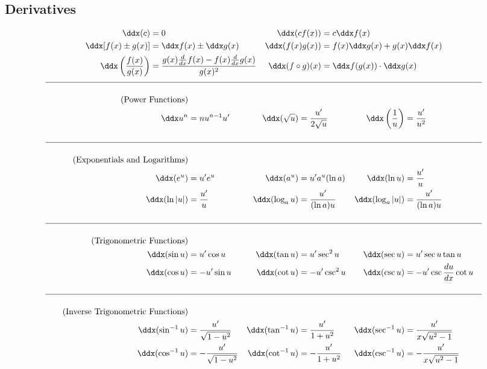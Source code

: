 \documentclass{book}
\newcommand{\dudx}{\dfrac{du}{dx}}
\begin{document}
\begin{appendices}
\section*{Derivatives}
\begin{align*}
\ddx(c) &= 0 & \ddx(cf(x))  &= c\ddx f(x) \\%
\ddx[f(x)\pm g(x)]  &= \ddx f(x) \pm \ddx g(x) &\ddx(f(x)g(x)) &= f(x)\ddx g(x) + g(x)\ddx f(x)\\
\ddx\left(\dfrac{f(x)}{g(x)}\right) &= \dfrac{g(x)\frac{d}{dx}f(x) - f(x)\frac{d}{dx} g(x)}{g(x)^2} & \ddx(f\circ g)(x) &=\ddx f(g(x))\cdot \ddx g(x)
\end{align*}
\begin{align}
\hline\nonumber\\\tag{Power Functions}\\
\nonumber \ddx u^n &= nu^{n-1}u' & \ddx(\sqrt{u}) &= \dfrac{u'}{2\sqrt{u}} & \ddx\left(\dfrac{1}{u}\right) &= \dfrac{u'}{u^2}\\\nonumber\\
\hline\nonumber\\\tag{Exponentials and Logarithms}\\
\nonumber \ddx(e^u) &= u'e^u & \ddx(a^u) &= u'a^u(\ln a) &\ddx(\ln u) &= \dfrac{u'}{u} \\
\nonumber \ddx(\ln |u|) &= \dfrac{u'}{u} & \ddx(\log_a u) &= \dfrac{u'}{(\ln a)u} & \ddx(\log_a |u|) &= \dfrac{u'}{(\ln a)u}\\\nonumber\\
\hline\nonumber\\\tag{Trigonometric Functions}\\
\nonumber \ddx(\sin u) &= u'\cos u & \ddx(\tan u) &= u'\sec^2 u& \ddx(\sec u) &= u'\sec u\tan u\\
\nonumber \ddx(\cos u) &= -u'\sin u & \ddx(\cot u) &= -u'\csc^2 u& \ddx(\csc u) &= -u'\csc \dudx\cot u\\\nonumber\\
\hline\nonumber\\\tag{Inverse Trigonometric Functions}\\
\nonumber \ddx(\sin^{-1} u) &= \dfrac{u'}{\sqrt{1-u^2}} & \ddx(\tan^{-1} u) &= \dfrac{u'}{1+u^2} &\ddx(\sec^{-1}u) &= \dfrac{u'}{x\sqrt{u^2-1}}\\
\nonumber \ddx(\cos^{-1}u) &=-\dfrac{u'}{\sqrt{1-u^2}} &\ddx(\cot^{-1}u) &= -\dfrac{u'}{1+u^2}&  \ddx(\csc^{-1}u) &=-\dfrac{u'}{x\sqrt{u^2-1}}\\\nonumber\\

\end{align}
\end{appendices}
\end{document}
